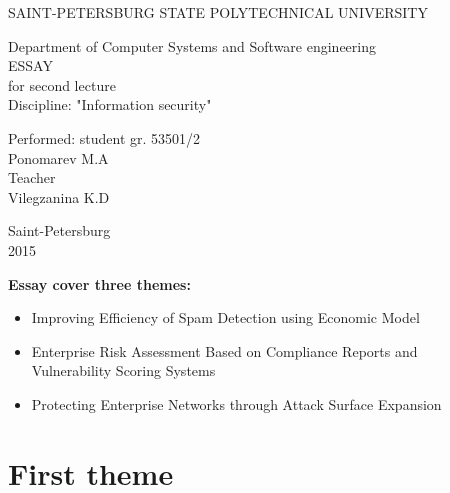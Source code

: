 \documentclass[10pt,a4paper]{article}
\begin{document}
\begin{center} 

\large SAINT-PETERSBURG STATE POLYTECHNICAL UNIVERSITY

\large Department of Computer Systems and Software engineering \\[8.5cm] 

\huge ESSAY \\[0.6cm] %
\large for second lecture\\
\large Discipline: "Information security"\\[4.5cm]

\end{center} 

\begin{flushright}
Performed: student gr. 53501/2 \\
Ponomarev M.A \\[1.0cm]


Teacher \\
Vilegzanina K.D
\end{flushright}


\vfill 

\begin{center} 
\large Saint-Petersburg \\
2015
\end{center} 

\thispagestyle{empty}

\newpage


\begin{center}


\begin{Large}
\textbf{Essay cover three themes:}

\begin{itemize}
	\item Improving Efficiency of Spam Detection using Economic Model
	\item Enterprise Risk Assessment Based on Compliance Reports and \\ 						  Vulnerability Scoring Systems
	 \item Protecting Enterprise Networks through Attack Surface Expansion
\end{itemize} 
\end{Large}
\end{center}
\bigskip

\section{First theme}
\end{document}
